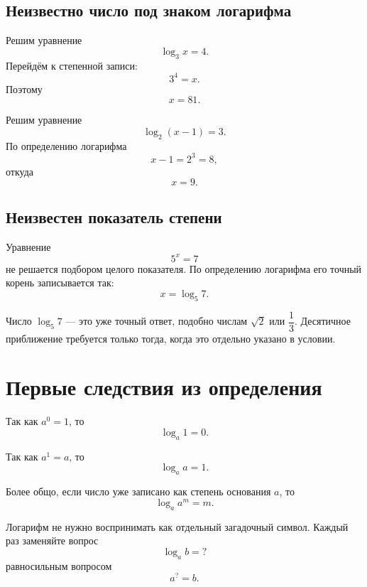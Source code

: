 \subsection{Неизвестно число под знаком логарифма}

\begin{trainingtask}[Пример 6]
  Решим уравнение
  \[
    \log_3 x=4.
  \]
  Перейдём к степенной записи:
  \[
    3^4=x.
  \]
  Поэтому
  \[
    \boxed{x=81}.
  \]
\end{trainingtask}

\begin{trainingtask}[Пример 7]
  Решим уравнение
  \[
    \log_2(x-1)=3.
  \]
  По определению логарифма
  \[
    x-1=2^3=8,
  \]
  откуда
  \[
    \boxed{x=9}.
  \]
\end{trainingtask}

\subsection{Неизвестен показатель степени}

\begin{trainingtask}[Пример 8]
  Уравнение
  \[
    5^x=7
  \]
  не решается подбором целого показателя. По определению логарифма его
  точный корень записывается так:
  \[
    \boxed{x=\log_5 7}.
  \]
\end{trainingtask}

\begin{notebox}
  Число \(\log_5 7\) --- это уже точный ответ, подобно числам
  \(\sqrt2\) или \(\dfrac13\). Десятичное приближение требуется только
  тогда, когда это отдельно указано в условии.
\end{notebox}

\section{Первые следствия из определения}

Так как \(a^0=1\), то
\[
  \boxed{\log_a1=0}.
\]

Так как \(a^1=a\), то
\[
  \boxed{\log_a a=1}.
\]

Более общо, если число уже записано как степень основания \(a\), то
\[
  \boxed{\log_a a^m=m}.
\]

\begin{propertybox}
  Логарифм не нужно воспринимать как отдельный загадочный символ.
  Каждый раз заменяйте вопрос
  \[
    \log_a b=?
  \]
  равносильным вопросом
  \[
    a^{?}=b.
  \]
\end{propertybox}

